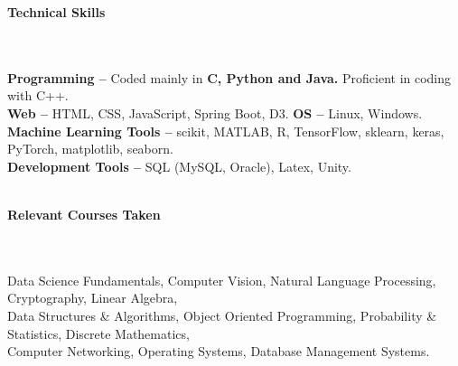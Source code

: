\documentclass[a4paper,10pt]{article}
\newcommand{\lsep}{-0.5cm}
\newcommand{\resheading}[1]{{\large \colorbox{mygrey}{\begin{minipage}{0.99\textwidth}{\textbf{#1 \vphantom{p\^{E}}}}\end{minipage}}}}
\begin{document}


\resheading{\textbf{Technical Skills} }\\\\[\lsep]

\indent\textbf{Programming -- }Coded mainly in \textbf{C, Python and Java.} Proficient in coding with C++.\\
\indent\textbf{Web -- } HTML, CSS, JavaScript, Spring Boot, D3. \indent\textbf{OS -- } Linux, Windows.
\\\indent\textbf{Machine Learning Tools --} scikit, MATLAB, R, TensorFlow, sklearn, keras, PyTorch, matplotlib, seaborn.
\\\indent\textbf{Development Tools --} SQL (MySQL, Oracle), Latex, Unity. %
\\\\

\resheading{\textbf{Relevant Courses Taken} }\\\\[\lsep]

\indent Data Science Fundamentals, Computer Vision, Natural Language Processing, Cryptography, Linear Algebra,\\
\indent  Data Structures \& Algorithms, Object Oriented Programming, Probability \& Statistics, Discrete Mathematics, \\\indent Computer Networking, Operating Systems, Database Management Systems.\\
\end{document}
